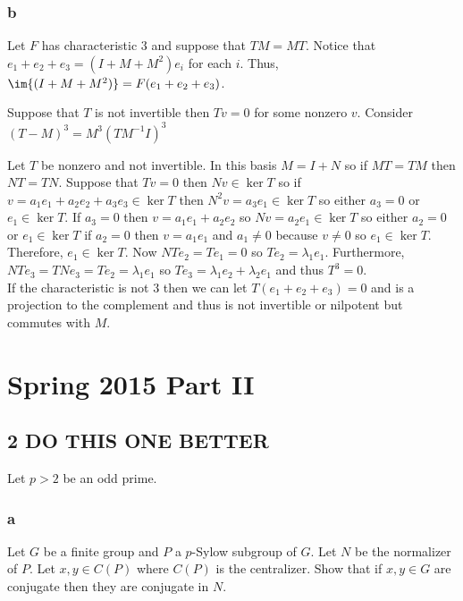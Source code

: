 \documentclass[12pt]{article}
\begin{document}
\subsubsection{b}

Let $F$ has characteristic $3$ and suppose that $T M = M T$. Notice that $e_1 + e_2 + e_3 = (I + M + M^2) e_i$ for each $i$. Thus, $\im{(I + M + M^2)} = F (e_1 + e_2 + e_3)$. 

Suppose that $T$ is not invertible then $T v = 0$ for some nonzero $v$. Consider $(T - M)^3 = M^3 (T M^{-1} I)^3$ 

Let $T$ be nonzero and not invertible.
In this basis $M = I + N$ so if $M T = T M$ then $N T = T N$. Suppose that $T v = 0$ then $N v \in \ker{T}$ so if $v = a_1 e_1 + a_2 e_2 + a_3 e_3 \in \ker{T}$ then $N^2 v = a_3 e_1 \in \ker{T}$ so either $a_3 = 0$ or $e_1 \in \ker{T}$. If $a_3 = 0$ then $v = a_1 e_1 + a_2 e_2$ so $N v = a_2 e_1 \in \ker{T}$ so either $a_2 = 0$ or $e_1 \in \ker{T}$ if $a_2 = 0$ then $v = a_1 e_1$ and $a_1 \neq 0$ because $v \neq 0$ so $e_1 \in \ker{T}$. Therefore, $e_1 \in \ker{T}$. Now $N T e_2 = T e_1 = 0$ so $T e_2 = \lambda_1 e_1$. Furthermore, $N T e_3 = T N e_3 = T e_2 = \lambda_1 e_1$ so $T e_3 = \lambda_1 e_2 + \lambda_2 e_1$ and thus $T^3 = 0$. 
\bigskip\\
If the characteristic is not $3$ then we can let $T (e_1 + e_2 + e_3) = 0$ and is a projection to the complement and thus is not invertible or nilpotent but commutes with $M$.

\section{Spring 2015 Part II}


\subsection{2 DO THIS ONE BETTER}

Let $p > 2$ be an odd prime.

\subsubsection{a}

\begin{exercise}
Let $G$ be a finite group and $P$ a $p$-Sylow subgroup of $G$. Let $N$ be the normalizer of $P$. Let $x, y \in C(P)$ where $C(P)$ is the centralizer. Show that if $x, y \in G$ are conjugate then they are conjugate in $N$. 
\end{exercise}
\end{document}
